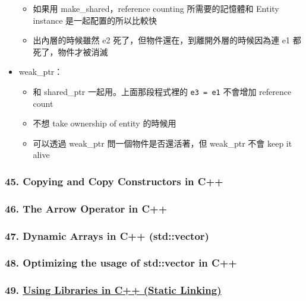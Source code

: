 \documentclass[11pt]{article}
\providecommand{\tightlist}{%
      \setlength{\itemsep}{0pt}\setlength{\parskip}{0pt}}
\begin{document}
\begin{itemize}
  \begin{itemize}
  \tightlist
  \item
    如果用 make\_shared，reference counting 所需要的記憶體和 Entity
    instance 是一起配置的所以比較快
  \item
    出內層的時候雖然 e2 死了，但物件還在，到離開外層的時候因為連 e1
    都死了，物件才被消滅
  \end{itemize}
\item
  weak\_ptr：

  \begin{itemize}
  \tightlist
  \item
    和 shared\_ptr 一起用。上面那段程式裡的 \texttt{e3\ =\ e1} 不會增加
    reference count
  \item
    不想 take ownership of entity 的時候用
  \item
    可以透過 weak\_ptr 問一個物件是否還活著，但 weak\_ptr 不會 keep it
    alive
  \end{itemize}
\end{itemize}

\hypertarget{copying-and-copy-constructors-in-c}{%
\subsubsection{45. Copying and Copy Constructors in
C++}\label{copying-and-copy-constructors-in-c}}

\hypertarget{the-arrow-operator-in-c}{%
\subsubsection{46. The Arrow Operator in
C++}\label{the-arrow-operator-in-c}}

\hypertarget{dynamic-arrays-in-c-stdvector}{%
\subsubsection{47. Dynamic Arrays in C++
(std::vector)}\label{dynamic-arrays-in-c-stdvector}}

\hypertarget{optimizing-the-usage-of-stdvector-in-c}{%
\subsubsection{48. Optimizing the usage of std::vector in
C++}\label{optimizing-the-usage-of-stdvector-in-c}}

\hypertarget{using-libraries-in-c-static-linking}{%
\subsubsection{\texorpdfstring{49.
\href{https://www.youtube.com/watch?v=or1dAmUO8k0\&list=PLlrATfBNZ98dudnM48yfGUldqGD0S4FFb\&index=50\&t=0s}{Using
Libraries in C++ (Static
Linking)}}{49. Using Libraries in C++ (Static Linking)}}\label{using-libraries-in-c-static-linking}}
\end{document}
